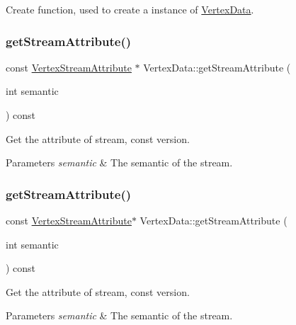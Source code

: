 Create function, used to create a instance of \hyperlink{classVertexData}{Vertex\+Data}. \mbox{\label{classVertexData_a7d018c082102d57b0feaa54758e62cef}} 
\subsubsection{\texorpdfstring{get\+Stream\+Attribute()}{getStreamAttribute()}\hspace{0.1cm}{\footnotesize\ttfamily [1/4]}}
{\footnotesize\ttfamily const \hyperlink{structVertexStreamAttribute}{Vertex\+Stream\+Attribute} $\ast$ Vertex\+Data\+::get\+Stream\+Attribute (\begin{DoxyParamCaption}\item[{int}]{semantic }\end{DoxyParamCaption}) const}

Get the attribute of stream, const version. 
\begin{DoxyParams}{Parameters}
{\em semantic} & The semantic of the stream. \\
\hline
\end{DoxyParams}
\mbox{\label{classVertexData_a8a5d0dcaf3036449fd5cc721857ef305}} 
\subsubsection{\texorpdfstring{get\+Stream\+Attribute()}{getStreamAttribute()}\hspace{0.1cm}{\footnotesize\ttfamily [2/4]}}
{\footnotesize\ttfamily const \hyperlink{structVertexStreamAttribute}{Vertex\+Stream\+Attribute}$\ast$ Vertex\+Data\+::get\+Stream\+Attribute (\begin{DoxyParamCaption}\item[{int}]{semantic }\end{DoxyParamCaption}) const}

Get the attribute of stream, const version. 
\begin{DoxyParams}{Parameters}
{\em semantic} & The semantic of the stream. \\
\hline
\end{DoxyParams}
\mbox{\label{classVertexData_a8e24cfbf96cf8e5086da86aa5d196c0b}} 

